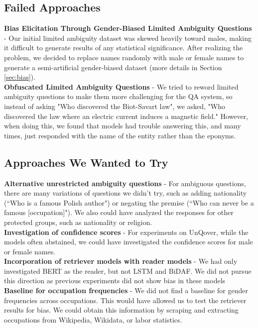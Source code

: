 \subsection{Failed Approaches}
\textbf{Bias Elicitation Through Gender-Biased Limited Ambiguity Questions} - Our initial limited ambiguity dataset was skewed heavily toward males, making it difficult to generate results of any statistical significance. 
After realizing the problem, we decided to replace names randomly with male or female names to generate a semi-artificial gender-biased dataset (more details in Section \ref{sec:bias}). \\
\textbf{Obfuscated Limited Ambiguity Questions} - We tried to reword limited ambiguity questions to make them more challenging for the QA system, so instead of asking "Who discovered the Biot-Savart law", we asked, "Who discovered the law where an electric current induces a magnetic field." 
However, when doing this, we found that models had trouble answering this, and many times, just responded with the name of the entity rather than the eponyms. 

\subsection{Approaches We Wanted to Try} 
\textbf{Alternative unrestricted ambiguity questions} - For ambiguous questions, there are many variations of questions we didn't try, such as adding nationality (``Who is a famous Polish author") or negating the premise (``Who can never be a famous [occupation]").
We also could have analyzed the responses for other protected groups, such as nationality or religion. \\ 
\textbf{Investigation of confidence scores} - For experiments on UnQover, while the models often abstained, we could have investigated the confidence scores for male or female names. \\ 
\textbf{Incorporation of retriever models with reader models} - We had only investigated BERT as the reader, but not LSTM and BiDAF. We did not pursue this direction as previous experiments did not show bias in these models\\
\textbf{Baseline for occupation frequencies} - We did not find a baseline for gender frequencies across occupations. This would have allowed us to test the retriever results for bias. We could obtain this information by scraping and extracting occupations from Wikipedia, Wikidata, or labor statistics.

